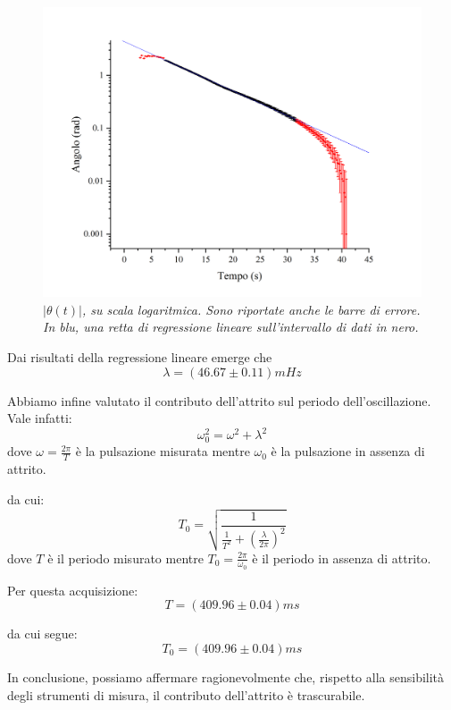 \documentclass{article}
\begin{document}
\begin{center}
    \begin{figure}[H]
        \includegraphics[trim={2cm 1cm 2cm 2.1cm},clip,width=\textwidth]{img/Exp4.jpg}
        \caption[]{\emph{
            $\left|\theta(t)\right|$, su scala logaritmica.
            Sono riportate anche le barre di errore.
            In blu, una retta di regressione lineare
            sull'intervallo di dati in nero.
        }}
    \end{figure}
\end{center}

Dai risultati della regressione lineare emerge che
\[\lambda = \left(46.67\pm0.11\right)\unit{mHz}\]

Abbiamo infine valutato il contributo dell'attrito sul periodo
dell'oscillazione. Vale infatti:
\[\omega_0^2 = \omega^2 + \lambda^2\]
dove $\omega=\frac{2\pi}{T}$ è la pulsazione misurata
mentre $\omega_0$ è la pulsazione in assenza di attrito.

da cui:
\[T_0 = \sqrt{\frac{1}{\frac{1}{T^2} + \left(\frac{\lambda}{2\pi}\right)^2}}\]
dove $T$ è il periodo misurato mentre
$T_0=\frac{2\pi}{\omega_0}$ è il periodo in assenza di attrito.

Per questa acquisizione:
\[T = \left(409.96\pm0.04\right)\unit{ms}\]

da cui segue:
\[T_0=\left(409.96\pm0.04\right)\unit{ms}\]

In conclusione, possiamo affermare ragionevolmente che,
rispetto alla sensibilità degli strumenti di misura,
il contributo dell'attrito è trascurabile.
\end{document}
